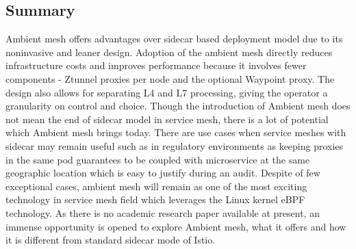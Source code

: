  \subsection{Summary}
 Ambient mesh offers advantages over sidecar based deployment model due to its noninvasive and leaner design. Adoption of the ambient mesh directly reduces infrastructure costs and improves performance because it involves fewer components - Ztunnel proxies per node and the optional Waypoint proxy. The design also allows for separating L4 and L7 processing, giving the operator a granularity on control and choice. Though the introduction of Ambient mesh does not mean the end of sidecar model in service mesh, there is a lot of potential which Ambient mesh brings today. There are use cases when service meshes with sidecar may remain useful such as in regulatory environments as keeping proxies in the same pod guarantees to be coupled with microservice at the same geographic location which is easy to justify during an audit. Despite of few exceptional cases, ambient mesh will remain as one of the most exciting technology in service mesh field which leverages the Linux kernel eBPF technology. As there is no academic research paper available at present, an immense opportunity is opened to explore Ambient mesh, what it offers and how it is different from standard sidecar mode of Istio.